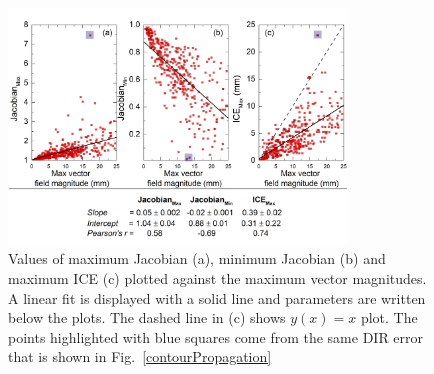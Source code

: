 \begin{figure}[H]
	\begin{center}		
		\includegraphics[width=0.8\textwidth]{./Vmm/Images/maxVf_lung.png}
		\caption{Values of maximum Jacobian (a), minimum Jacobian (b) and maximum ICE (c) plotted against the maximum vector magnitudes. A linear fit is displayed with a solid line and parameters are written below the plots. 
		The dashed line in (c) shows $y(x)= x$ plot.
			The points highlighted with blue squares come from the same DIR error that is shown in Fig.~\ref{contourPropagation}}
		\label{maxvf}
	\end{center}
\end{figure}


\newpage

